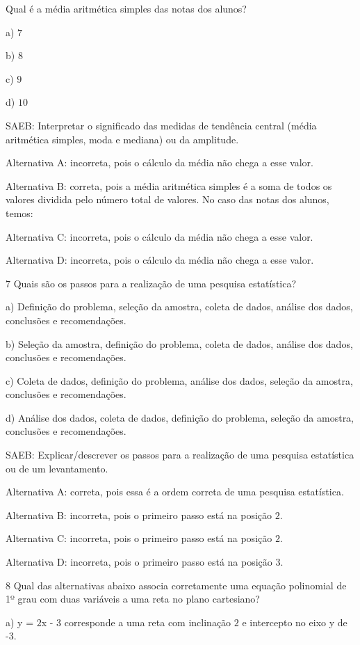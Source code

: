 Qual é a média aritmética simples das notas dos alunos?

a) $7$

b) $8$

c) $9$

d) $10$

SAEB: Interpretar o significado das medidas de tendência central (média
aritmética simples, moda e mediana) ou da amplitude.

Alternativa A: incorreta, pois o cálculo da média não chega a esse
valor.

Alternativa B: correta, pois a média aritmética simples é a soma de
todos os valores dividida pelo número total de valores. No caso das
notas dos alunos, temos:

Alternativa C: incorreta, pois o cálculo da média não chega a esse
valor.

Alternativa D: incorreta, pois o cálculo da média não chega a esse
valor.

\num{7}  Quais são os passos para a realização de uma pesquisa estatística?

a) Definição do problema, seleção da amostra, coleta de dados, análise
dos dados, conclusões e recomendações.

b) Seleção da amostra, definição do problema, coleta de dados, análise
dos dados, conclusões e recomendações.

c) Coleta de dados, definição do problema, análise dos dados, seleção da
amostra, conclusões e recomendações.

d) Análise dos dados, coleta de dados, definição do problema, seleção da
amostra, conclusões e recomendações.

SAEB: Explicar/descrever os passos para a realização de uma pesquisa
estatística ou de um levantamento.

Alternativa A: correta, pois essa é a ordem correta de uma pesquisa
estatística.

Alternativa B: incorreta, pois o primeiro passo está na posição $2$.

Alternativa C: incorreta, pois o primeiro passo está na posição $2$.

Alternativa D: incorreta, pois o primeiro passo está na posição $3$.

\num{8}  Qual das alternativas abaixo associa corretamente uma equação
polinomial de 1º grau com duas variáveis a uma reta no plano cartesiano?

a) y = $2$x - $3$ corresponde a uma reta com inclinação $2$ e intercepto no
eixo y de -3.

